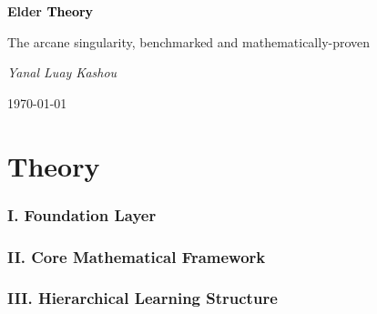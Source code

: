 \documentclass[11pt,twoside]{book}
\begin{document}
\frontmatter

\begin{titlepage}
    \centering
    \vspace*{2cm}
    {\Huge\bfseries \textcolor{DarkSkyBlue}{Elder }\textrm{\textcolor{black}{Theory}}\par}
    \vspace{2cm}
    {\Large The arcane singularity, benchmarked and mathematically-proven\par}
    \vspace{4cm}
    {\Large\itshape Yanal Luay Kashou\par}
    \vfill
    {\large \today\par}
\end{titlepage}

\tableofcontents

\mainmatter



\part{Theory}

\section*{I. Foundation Layer}

\section*{II. Core Mathematical Framework}

\section*{III. Hierarchical Learning Structure}
\end{document}
